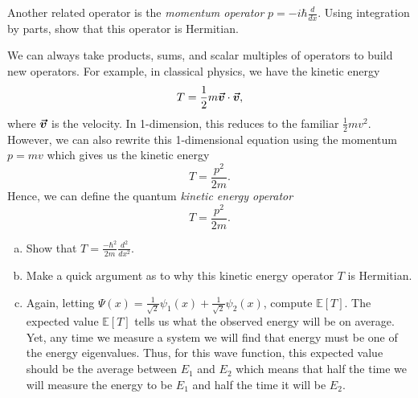 \documentclass[12pt]{article} %
\begin{document}
\newpage
\begin{problem}
	Another related operator is the \emph{momentum operator} $p = -i\hbar \frac{d}{dx}$. Using integration by parts, show that this operator is Hermitian.
\end{problem}
\begin{solution}

\end{solution}

\newpage
\begin{problem}
	We can always take products, sums, and scalar multiples of operators to build new operators.  For example, in classical physics, we have the kinetic energy
	\[
	T=\frac{1}{2}m \boldsymbol{\vec{v}} \cdot \boldsymbol{\vec{v}},
	\]
	where $\boldsymbol{\vec{v}}$ is the velocity. In 1-dimension, this reduces to the familiar $\frac{1}{2}mv^2$.  However, we can also rewrite this 1-dimensional equation using the momentum $p=mv$ which gives us the kinetic energy
	\[
	T=\frac{p^2}{2m}.
	\]
	Hence, we can define the quantum \emph{kinetic energy operator}
	\[
	T=\frac{p^2}{2m}.
	\]
	\begin{enumerate}[(a)]
		\item Show that $T = \frac{-\hbar^2}{2m}\frac{d^2}{dx^2}$.
		\item Make a quick argument as to why this kinetic energy operator $T$ is Hermitian.
		\item Again, letting $\Psi(x)=\frac{1}{\sqrt{2}}\psi_1(x)+\frac{1}{\sqrt{2}}\psi_2(x)$, compute $\mathbb{E}[T]$. The expected value $\mathbb{E}[T]$ tells us what the observed energy will be on average. Yet, any time we measure a system we will find that energy must be one of the energy eigenvalues. Thus, for this wave function, this expected value should be the average between $E_1$ and $E_2$ which means that half the time we will measure the energy to be $E_1$ and half the time it will be $E_2$.
	\end{enumerate}	
\end{problem}
\end{document}
